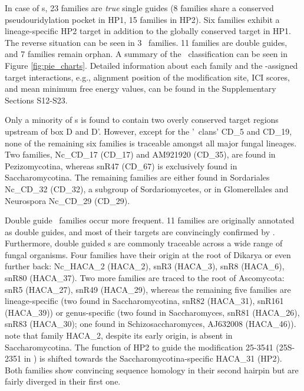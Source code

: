 In case of {\haca}s, 23 families are \textit{true} single guides (8
families share a conserved pseudouridylation pocket in HP1, 15 families in
HP2). Six families exhibit a lineage-specific HP2 target in addition to the
globally conserved target in HP1. The reverse situation can be seen in 3
\haca\ families. 11 families are double guides, and 7 families remain
orphan. A summary of the \sno\ classification can be seen in Figure
\ref{fig:pie_charts}.  Detailed information about each family and the
\snostrip-assigned target interactions, e.g., alignment position of the
modification site, ICI scores, and mean minimum free energy values, can be
found in the Supplementary Sections S12-S23.

Only a minority of \cd s is found to contain two overly conserved
target regions upstream of box D and D'. However, except for the '\sno\
clans' CD\_5 and CD\_19, none of the remaining six families is
traceable amongst all major fungal lineages. Two families, Nc\_CD\_17
(CD\_17) and AM921920 (CD\_35), are found in Pezizomycotina, whereas
snR47 (CD\_67) is exclusively found in Saccharomycotina. The remaining
families are either found in Sordariales Nc\_CD\_32 (CD\_32), a
subgroup of Sordariomycetes, or in Glomerellales and Neurospora
Nc\_CD\_29 (CD\_29).

Double guide \haca\ families occur more frequent. 11 families are
originally annotated as double guides, and most of their targets are
convincingly confirmed by \snostrip. Furthermore, double guided \haca s are
commonly traceable across a wide range of fungal organisms. Four families
have their origin at the root of Dikarya or even further back: Nc\_HACA\_2
(HACA\_2), snR3 (HACA\_3), snR8 (HACA\_6), snR80 (HACA\_37). Two more
families are traced to the root of Ascomycota: snR5 (HACA\_27), snR49
(HACA\_29), whereas the remaining five families are lineage-specific (two
found in Saccharomycotina, snR82 (HACA\_31), snR161 (HACA\_39)) or
genus-specific (two found in Saccharomyces, snR81 (HACA\_26), snR83
(HACA\_30); one found in Schizosaccharomyces, AJ632008
(HACA\_46)).  note that family HACA\_2, despite its early origin,
is absent in Saccharomycotina. The function of HP2 to guide the
modification 25-3541 (25S-2351 in \sce) is shifted towards the
Saccharomycotina-specific HACA\_31 (HP2). Both families show convincing
sequence homology in their second hairpin but are fairly diverged in their
first one.

